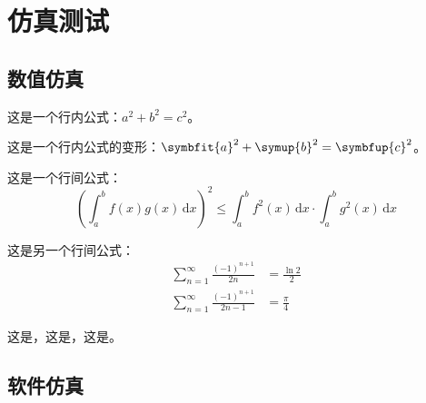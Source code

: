 \chapter{仿真测试}

\section{数值仿真}

这是一个行内公式：$a^2+b^2=c^2$。

这是一个行内公式的变形：$\symbfit{a}^2+\symup{b}^2=\symbfup{c}^2$。

这是一个行间公式：
\begin{equation}
    \left(\int_a^b f(x) g(x)\,\mathrm{d}x\right)^2 \leq \int_a^b f^2(x)\,\mathrm{d}x \cdot \int_a^b g^2(x)\,\mathrm{d}x
    \label{testeq1}
\end{equation}

这是另一个行间公式：
\begin{align}
    \sum_{n=1}^{\infty} \frac{(-1)^{n+1}}{2n}   & = \frac{\ln 2}{2} \label{testeq2} \\
    \sum_{n=1}^{\infty} \frac{(-1)^{n+1}}{2n-1} & = \frac{\pi}{4} \label{testeq3}
\end{align}

这是，这是，这是。

\section{软件仿真}
